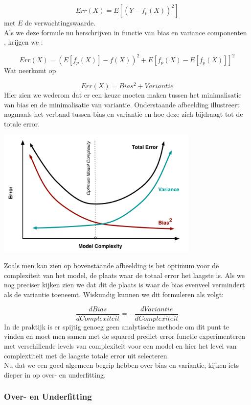 \[ Err(X)=E[(Y - f_{p}(X))^2] \]
%
met $E$ de verwachtingswaarde.\\
%
Als we deze formule nu herschrijven in functie van bias en variance componenten \cite{hastie2009elements}, krijgen we :

\[ Err(X)=(E[f_{p}(X)] - f(X))^2+E[f_{p}(X) - E[f_{p}(X)]]^2 \]
%
Wat neerkomt op 

\[Err(X)= Bias^2 + Variantie \]
%
Hier zien we wederom dat er een keuze moeten maken tussen het minimalisatie van bias en de minimalisatie van variantie.
Onderstaande afbeelding illustreert nogmaals het verband tussen bias en variantie en hoe deze zich bijdraagt tot de totale error.
\begin{center}
  \includegraphics[width=10cm]{biasvariance_tradeoff}
  \label{fig:biasvariance}
\end{center}
\newline
Zoals men kan zien op bovenstaande afbeelding is het optimum voor de complexiteit van het model, de plaats waar de totaal error het laagste is. Als we nog preciser kijken zien we dat dit de plaats is waar de bias evenveel vermindert als de variantie toeneemt. Wiskundig kunnen we dit formuleren als volgt:

\[\frac{dBias}{dComplexiteit} = -\frac{dVariantie}{dComplexiteit} \]
%
In de praktijk is er spijtig genoeg geen analytische methode om dit punt te vinden en moet men samen met de squared predict error functie experimenteren met verschillende levels van complexiteit voor een model en hier het level van complextiteit met de laagste totale error uit selecteren.\\
%
Nu dat we een goed algemeen begrip hebben over bias en variantie, kijken iets dieper in op over- en underfitting.

\subsubsection{Over- en Underfitting}\label{Over- en Underfitting}

